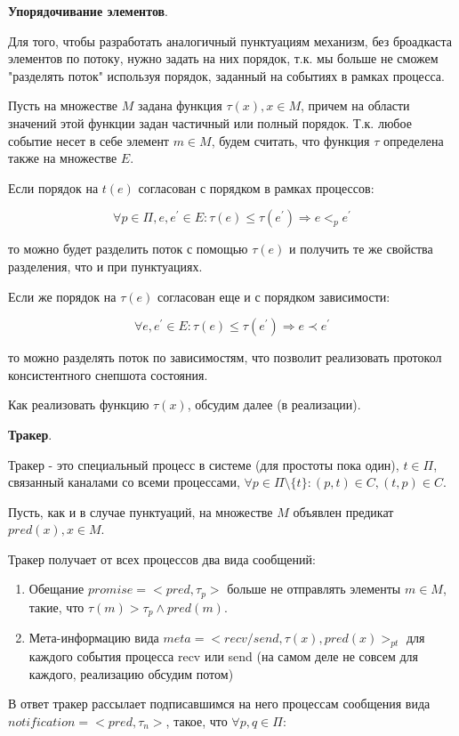 \documentclass[12pt]{article}
\begin{document}
\textbf{Упорядочивание элементов}.

Для того, чтобы разработать аналогичный пунктуациям механизм, без броадкаста элементов по потоку, нужно задать на них порядок, т.к. мы больше не сможем "разделять поток" используя порядок, заданный на событиях в рамках процесса.

Пусть на множестве $M$ задана функция $\tau(x), x \in M$, причем на области значений этой функции задан частичный или полный порядок. Т.к. любое событие несет в себе элемент $m \in M$, будем считать, что функция $\tau$ определена также на множестве $E$.

Если порядок на $t(e)$ согласован с порядком в рамках процессов:

$$\forall p \in \Pi, e,e^{'} \in E: \tau(e) \leq \tau(e^{'}) \Rightarrow e <_p e^{'}$$

то можно будет разделить поток с помощью $\tau(e)$ и получить те же свойства разделения, что и при пунктуациях.

Если же порядок на $\tau(e)$ согласован еще и с порядком зависимости:

$$\forall e,e^{'} \in E: \tau(e) \leq \tau(e^{'}) \Rightarrow e \prec e^{'}$$

то можно разделять поток по зависимостям, что позволит реализовать протокол консистентного снепшота состояния.

Как реализовать функцию $\tau(x)$, обсудим далее (в реализации).

\textbf{Тракер}.

Тракер - это специальный процесс в системе (для простоты пока один), $t \in \Pi$, связанный каналами со всеми процессами, $\forall p \in \Pi \setminus \{t\}: (p,t) \in C, (t,p) \in C$.

Пусть, как и в случае пунктуаций, на множестве $M$ объявлен предикат $pred(x), x \in M$.

Тракер получает от всех процессов два вида сообщений:

\begin{enumerate}
    \item Обещание $promise = <pred, \tau_{p}>$ больше не отправлять элементы $m \in M$, такие, что $\tau(m) > \tau_{p} \land pred(m)$.
    \item Мета-информацию вида $meta = <recv/send, \tau(x), pred(x)>_{pt}$ для каждого события процесса recv или send (на самом деле не совсем для каждого, реализацию обсудим потом)
\end{enumerate}

В ответ тракер рассылает подписавшимся на него процессам сообщения вида $notification = <pred,\tau_n>$, такое, что $\forall p,q \in \Pi$:
\end{document}
